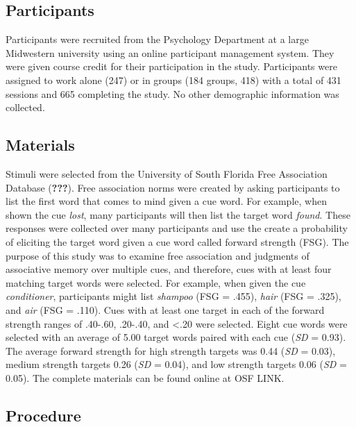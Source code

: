 \documentclass[man]{apa6}
\theoremstyle{definition}
\theoremstyle{definition}
\theoremstyle{definition}
\theoremstyle{remark}
\begin{document}
\hypertarget{participants}{%
\subsection{Participants}\label{participants}}

Participants were recruited from the Psychology Department at a large
Midwestern university using an online participant management system.
They were given course credit for their participation in the study.
Participants were assigned to work alone (247) or in groups (184 groups,
418) with a total of 431 sessions and 665 completing the study. No other
demographic information was collected.

\hypertarget{materials}{%
\subsection{Materials}\label{materials}}

Stimuli were selected from the University of South Florida Free
Association Database ({\textbf{???}}). Free association norms were
created by asking participants to list the first word that comes to mind
given a cue word. For example, when shown the cue \emph{lost}, many
participants will then list the target word \emph{found}. These
responses were collected over many participants and use the create a
probability of eliciting the target word given a cue word called forward
strength (FSG). The purpose of this study was to examine free
association and judgments of associative memory over multiple cues, and
therefore, cues with at least four matching target words were selected.
For example, when given the cue \emph{conditioner}, participants might
list \emph{shampoo} (FSG = .455), \emph{hair} (FSG = .325), and
\emph{air} (FSG = .110). Cues with at least one target in each of the
forward strength ranges of .40-.60, .20-.40, and \textless{}.20 were
selected. Eight cue words were selected with an average of 5.00 target
words paired with each cue (\emph{SD} = 0.93). The average forward
strength for high strength targets was 0.44 (\emph{SD} = 0.03), medium
strength targets 0.26 (\emph{SD} = 0.04), and low strength targets 0.06
(\emph{SD} = 0.05). The complete materials can be found online at OSF
LINK.

\hypertarget{procedure}{%
\subsection{Procedure}\label{procedure}}
\end{document}
